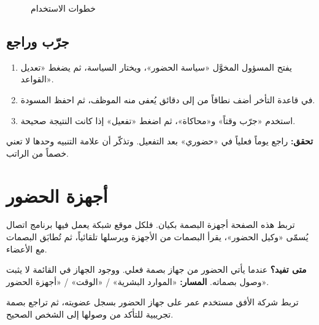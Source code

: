 \begin{figure}[H]
\centering
{}
\rclegend
\caption{خطوات الاستخدام}
\label{fig:hr-feature-attendance-policy-flow}
\end{figure}

\subsection{جرّب وراجع}

\begin{enumerate}
  \item يفتح المسؤول المخوَّل «سياسة الحضور»، ويختار السياسة، ثم يضغط «تعديل القواعد».
  \item في قاعدة التأخر أضف نطاقاً من  إلى  دقائق يُعفى منه الموظف، ثم احفظ المسودة.
  \item استخدم «جرّب وقتاً» و«محاكاة»، ثم اضغط «تفعيل» إذا كانت النتيجة صحيحة.
\end{enumerate}

\textbf{تحقق:} راجع يوماً فعلياً في «حضوري» بعد التفعيل. وتذكّر أن علامة التنبيه وحدها لا تعني خصماً من الراتب.

\clearpage
\section{أجهزة الحضور}
\label{sec:hr-feature-attendance-terminals}

تربط هذه الصفحة أجهزة البصمة بكيان. فلكل موقع شبكة يعمل فيها برنامج اتصال يُسمّى «وكيل الحضور»، يقرأ البصمات من الأجهزة ويرسلها تلقائياً، ثم تُطابَق البصمات مع الأعضاء.

\textbf{متى تفيد؟} عندما يأتي الحضور من جهاز بصمة فعلي. ووجود الجهاز في القائمة لا يثبت وصول بصماته. \textbf{المسار:} «الموارد البشرية» / «الوقت» / «أجهزة الحضور».

\begin{rcnote}
تربط شركة الأفق مستخدم عمر على جهاز الحضور بسجل عضويته، ثم تراجع بصمة تجريبية للتأكد من وصولها إلى الشخص الصحيح.
\end{rcnote}

